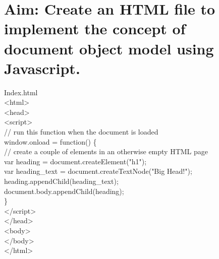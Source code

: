 \section*{\fontsize{16}{14}\selectfont Aim: Create an HTML file to implement the concept of document object model using Javascript.}
Index.html\\
<html>\\
  <head>\\
    <script>\\
       // run this function when the document is loaded\\
       window.onload = function() \{\\
         // create a couple of elements in an otherwise empty HTML page\\
         var heading = document.createElement("h1");\\
         var heading\_text = document.createTextNode("Big Head!");\\
         heading.appendChild(heading\_text);\\
         document.body.appendChild(heading);\\
      \}\\
    </script>\\
  </head>\\
  <body>\\
  </body>\\
</html>\\
